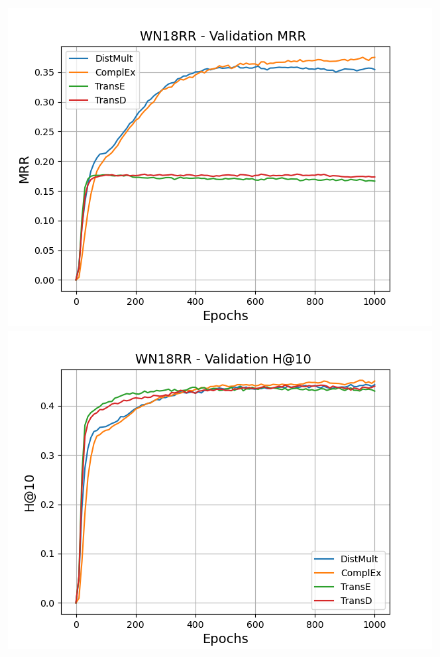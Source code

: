 \begin{figure}
    \centering
    \begin{minipage}{.3\textwidth}
      \centering
      \includegraphics[width=\linewidth]{figures/results/pretrain/wn18rr/pretrain_wn18rr_mrrs.png}
    \end{minipage}%
    \begin{minipage}{.3\textwidth}
      \centering
      \includegraphics[width=\linewidth]{figures/results/pretrain/wn18rr/pretrain_wn18rr_hit10.png}
    \end{minipage}
    \begin{minipage}{.3\textwidth}
      \centering

\end{minipage}
\end{figure}
